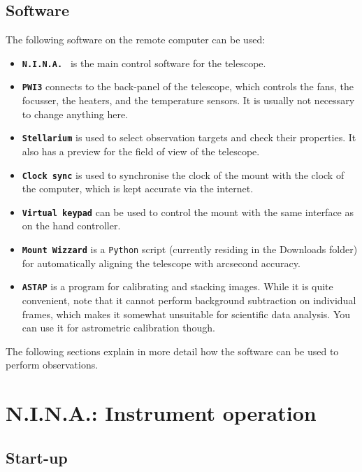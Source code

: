 \documentclass[a4paper, 11pt, fleqn]{memoir}
\begin{document}
\subsection{Software}
The following software on the remote computer can be used:
\begin{itemize}
    \item \textbf{\texttt{N.I.N.A.
              }} is the main control software for the telescope.
    \item
          \textbf{\texttt{PWI3}} connects to the back-panel of the telescope, which controls the fans, the focusser, the heaters, and the temperature sensors.
          It is usually not necessary to change anything here.
    \item
          \textbf{\texttt{Stellarium}} is used to select observation targets and check their properties.
          It also has a preview for the field of view of the telescope.
    \item
          \textbf{\texttt{Clock sync}} is used to synchronise the clock of the mount with the clock of the computer, which is kept accurate via the internet.
    \item
          \textbf{\texttt{Virtual keypad}} can be used to control the mount with the same interface as on the hand controller.
    \item
          \textbf{\texttt{Mount Wizzard}} is a \texttt{Python} script (currently residing in the Downloads folder) for automatically aligning the telescope with arcsecond accuracy.
    \item
          \textbf{\texttt{ASTAP}} is a program for calibrating and stacking images.
          While it is quite convenient, note that it cannot perform background subtraction on individual frames, which makes it somewhat unsuitable for scientific data analysis.
          You can use it for astrometric calibration though.
\end{itemize}
The following sections explain in more detail how the software can be used to perform observations.

\section{N.I.N.A.: Instrument operation}

\subsection{Start-up}\label{sec:NINA:start-up}
\end{document}
